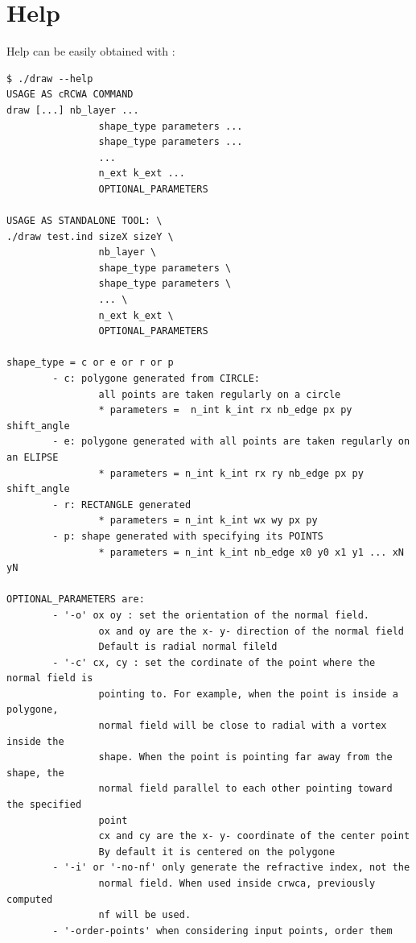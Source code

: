 \section{Help}
Help can be easily obtained with :
\begin{lstlisting}
$ ./draw --help 
USAGE AS cRCWA COMMAND           
draw [...] nb_layer ...
                shape_type parameters ... 
                shape_type parameters ...
                ...  
                n_ext k_ext ...
                OPTIONAL_PARAMETERS

USAGE AS STANDALONE TOOL: \ 
./draw test.ind sizeX sizeY \
                nb_layer \ 
                shape_type parameters \ 
                shape_type parameters \ 
                ... \ 
                n_ext k_ext \ 
                OPTIONAL_PARAMETERS

shape_type = c or e or r or p
        - c: polygone generated from CIRCLE: 
                all points are taken regularly on a circle
                * parameters =  n_int k_int rx nb_edge px py shift_angle
        - e: polygone generated with all points are taken regularly on an ELIPSE
                * parameters = n_int k_int rx ry nb_edge px py shift_angle 
        - r: RECTANGLE generated
                * parameters = n_int k_int wx wy px py 
        - p: shape generated with specifying its POINTS
                * parameters = n_int k_int nb_edge x0 y0 x1 y1 ... xN yN

OPTIONAL_PARAMETERS are:
        - '-o' ox oy : set the orientation of the normal field. 
                ox and oy are the x- y- direction of the normal field
                Default is radial normal fileld
        - '-c' cx, cy : set the cordinate of the point where the normal field is
                pointing to. For example, when the point is inside a polygone,
                normal field will be close to radial with a vortex inside the
                shape. When the point is pointing far away from the shape, the 
                normal field parallel to each other pointing toward the specified
                point 
                cx and cy are the x- y- coordinate of the center point
                By default it is centered on the polygone
        - '-i' or '-no-nf' only generate the refractive index, not the  
                normal field. When used inside crwca, previously computed 
                nf will be used.
        - '-order-points' when considering input points, order them               
                           

\end{lstlisting}
